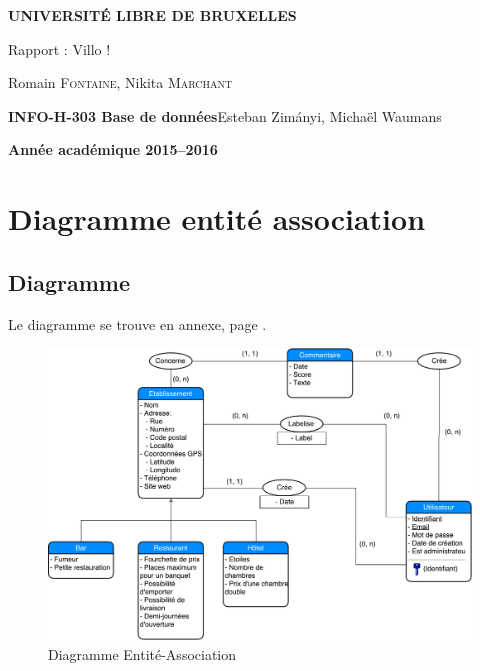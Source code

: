 \documentclass[10pt,a4paper]{article}
\begin{document}
\begin{titlepage}
    \begin{center}
        \textbf{\textsc{UNIVERSIT\'E LIBRE DE BRUXELLES}}\\
        \vfill{}\vfill{}
        \begin{center}{\Huge Rapport : Villo !}\end{center}{\Huge \par}
        \begin{center}{\large Romain \textsc{Fontaine}, Nikita \textsc{Marchant}}\end{center}{\Huge \par}
        \vfill{}\vfill{} \vfill{}
        \begin{flushleft}{\large \textbf{INFO-H-303 Base de données}}\hfill{Esteban Zimányi, Michaël Waumans}\end{flushleft}{\large\par}
        \vfill{}\vfill{}\enlargethispage{3cm}
        \textbf{Année académique 2015--2016}
    \end{center}
\end{titlepage}

\setlength{\parindent}{1.5em}
\setlength{\parskip}{1em}
\linespread{1.1}





\section{Diagramme entité association}
\subsection{Diagramme}

Le diagramme se trouve en annexe, page \pageref{diagram}.

\begin{figure}[Hbt]
    \includegraphics[angle=90, scale=0.6]{EA.pdf}
    \caption{Diagramme Entité-Association}
    \label{diagram}
\end{figure}
\end{document}
